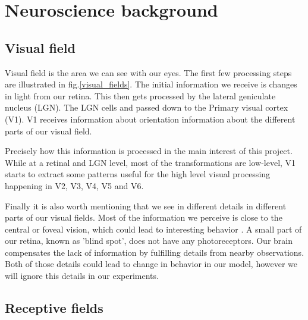 \section{Neuroscience background}
\subsection{Visual field}

Visual field is the area we can see with our eyes. The first few processing steps are illustrated in fig.\ref{visual_fields}. The initial information we receive is changes in light from our retina. This then gets processed by the lateral geniculate nucleus (LGN). The LGN cells  and passed down to the Primary visual cortex (V1). V1 receives information about orientation information about the different parts of our visual field. 


Precisely how this information is processed in the main interest of this project. While at a retinal and LGN level, most of the transformations are low-level, V1 starts to extract some patterns useful for the high level visual processing happening in V2, V3, V4, V5 and V6. 

Finally it is also worth mentioning that we see in different details in different parts of our visual fields. Most of the information we perceive is close to the central or foveal vision, which could lead to interesting behavior \cite{knight2008drastically}. A small part of our retina, known as 'blind spot', does not have any photoreceptors. Our brain compensates the lack of information by fulfilling details from nearby observations. Both of those details could lead to change in behavior in our model, however we will ignore this details in our experiments.


\subsection{Receptive fields}

